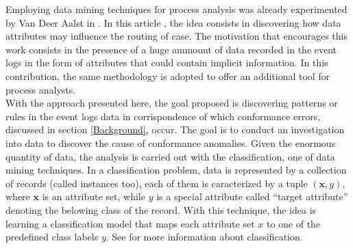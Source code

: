 \documentclass[11pt]{article}
\begin{document}
 

Employing data mining techniques for process analysis was already experimented by Van Deer Aalst in \cite{decision mining in business process}. In this article \cite{}, the idea consists in discovering how data attributes may influence the routing of case. The motivation that encourages this work consists in the presence of a huge ammount of data recorded in the event logs in the form of attributes that could contain implicit information. In this contribution, the same methodology is adopted to offer an additional tool for process analysts.\\

With the approach presented here, the goal proposed is discovering patterns or rules in the event logs data in corrispondence of which conformance errors, discussed in section \ref{Background}, occur. The goal is to conduct an investigation into data to discover the cause of conformance anomalies. Given the enormous quantity of data, the analysis is carried out with the classification, one of data mining techniques. In a classification problem, data is represented by a collection of records (called instances too), each of them is caracterized by a tuple $(\mathbf{x},y)$, where $\mathbf{x}$ is an attribute set, while $y$ is a special attribute called ``target attribute'' denoting the belowing class of the record. With this technique, the idea is learning a classification model that maps each attribute set $x$ to one of the predefined class labels $y$. See \cite{} for more information about classification.\\
\end{document}
